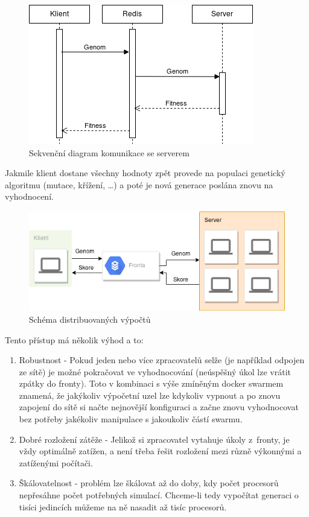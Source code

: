 \begin{figure}[h!]
	\centering
	\includegraphics[width=0.7\linewidth]{server_use_case}
	\caption{Sekvenční diagram komunikace se serverem}
	\label{fig:serverusecase}
\end{figure}

Jakmile klient dostane všechny hodnoty zpět provede na populaci genetický algoritmu (mutace, křížení, \dots) a poté je nová generace poslána znovu na vyhodnocení.

\begin{figure}[h!]
	\centering
	\includegraphics[scale=0.5]{distributed}
	\caption[Schéma distribuovaných výpočtů]{Schéma distribuovaných výpočtů}
	\label{fig:distributed}
\end{figure}

Tento přístup má několik výhod a to:

\begin{enumerate}
	\item Robustnost - Pokud jeden nebo více zpracovatelů selže (je například odpojen ze sítě) je možné pokračovat ve vyhodnocování (neúspěšný úkol lze vrátit zpátky do fronty). Toto v kombinaci s výše zmíněným docker swarmem znamená, že jakýkoliv výpočetní uzel lze kdykoliv vypnout a po znovu zapojení do sítě si načte nejnovější konfiguraci a začne znovu vyhodnocovat bez potřeby jakékoliv manipulace s jakoukoliv částí swarmu.
	\item Dobré rozložení zátěže - Jelikož si zpracovatel vytahuje úkoly z~fronty, je vždy optimálně zatížen, a není třeba řešit rozložení mezi různě výkonnými a zatíženými počítači.
	\item Škálovatelnost - problém lze škálovat až do doby, kdy počet procesorů nepřesáhne počet potřebných simulací. Chceme-li tedy vypočítat generaci o tisíci jedincích můžeme na ně nasadit až tisíc procesorů.
\end{enumerate}


